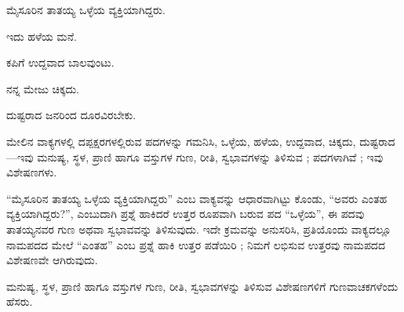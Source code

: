 
\vspace{2.5pt plus 3pt minus 0.5pt}\noindent\hspace*{1.2em}\hspace{0.55em}ಮೈಸೂರಿನ ತಾತಯ್ಯ ಒಳ್ಳೆಯ ವ್ಯಕ್ತಿಯಾಗಿದ್ದರು.\par

\vspace{2.5pt plus 3pt minus 0.5pt}\noindent\hspace*{1.2em}\hspace{0.55em}ಇದು ಹಳೆಯ ಮನೆ.\par

\vspace{2.5pt plus 3pt minus 0.5pt}\noindent\hspace*{1.2em}\hspace{0.55em}ಕಪಿಗೆ ಉದ್ದವಾದ ಬಾಲವುಂಟು.\par

\vspace{2.5pt plus 3pt minus 0.5pt}\noindent\hspace*{1.2em}\hspace{0.55em}ನನ್ನ ಮೇಜು ಚಿಕ್ಕದು.\par

\vspace{2.5pt plus 3pt minus 0.5pt}\noindent\hspace*{1.2em}\hspace{0.55em}ದುಷ್ಟರಾದ ಜನರಿಂದ ದೂರವಿರಬೇಕು.\par

\indent ಮೇಲಿನ ವಾಕ್ಯಗಳಲ್ಲಿ ದಪ್ಪಕ್ಷರಗಳಲ್ಲಿರುವ ಪದಗಳನ್ನು ಗಮನಿಸಿ, ಒಳ್ಳೆಯ, ಹಳೆಯ, ಉದ್ದವಾದ, ಚಿಕ್ಕದು, ದುಷ್ಟರಾದ—ಇವು ಮನುಷ್ಯ, ಸ್ಥಳ, ಪ್ರಾಣಿ ಹಾಗೂ ವಸ್ತುಗಳ ಗುಣ, ರೀತಿ, ಸ್ವಭಾವಗಳನ್ನು ತಿಳಿಸುವ ; ಪದಗಳಾಗಿವೆ ; ಇವು ವಿಶೇಷಣಗಳು.\par

\indent “ಮೈಸೂರಿನ ತಾತಯ್ಯ ಒಳ್ಳೆಯ ವ್ಯಕ್ತಿಯಾಗಿದ್ದರು” ಎಂಬ ವಾಕ್ಯವನ್ನು ಆಧಾರವಾಗಿಟ್ಟು ಕೊಂಡು, “ಅವರು ಎಂತಹ ವ್ಯಕ್ತಿಯಾಗಿದ್ದರು?”, ಎಂಬುದಾಗಿ ಪ್ರಶ್ನೆ ಹಾಕಿದರೆ ಉತ್ತರ ರೂಪವಾಗಿ ಬರುವ ಪದ “ಒಳ್ಳೆಯ”, ಈ ಪದವು ತಾತಯ್ಯನವರ ಗುಣ ಅಥವಾ ಸ್ವಭಾವವನ್ನು ತಿಳಿಸುವುದು. ಇದೇ ಕ್ರಮವನ್ನು ಅನುಸರಿಸಿ, ಪ್ರತಿಯೊಂದು ವಾಕ್ಯದಲ್ಲೂ ನಾಮಪದದ ಮೇಲೆ “ಎಂತಹ” ಎಂಬ ಪ್ರಶ್ನೆ ಹಾಕಿ ಉತ್ತರ ಪಡೆಯಿರಿ ; ನಿಮಗೆ ಲಭಿಸುವ ಉತ್ತರವು ನಾಮಪದದ ವಿಶೇಷಣವೇ ಆಗಿರುವುದು.\par

\begin{kbvrule}
\hspace{0.5em}ಮನುಷ್ಯ, ಸ್ಥಳ, ಪ್ರಾಣಿ ಹಾಗೂ ವಸ್ತುಗಳ ಗುಣ, ರೀತಿ, ಸ್ವಭಾವಗಳನ್ನು ತಿಳಿಸುವ ವಿಶೇಷಣಗಳಿಗೆ ಗುಣವಾಚಕಗಳೆಂದು ಹೆಸರು.
\end{kbvrule}


